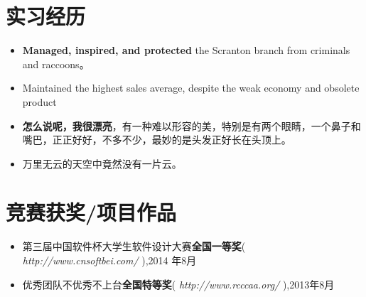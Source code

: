 \documentclass{resume_withphoto}
\begin{document}

\section{实习经历}
\begin{itemize}
  \item \textbf{Managed, inspired, and protected }the Scranton branch from criminals and raccoons。
  \item Maintained the highest sales average, despite the weak economy and obsolete product
\end{itemize}

\begin{itemize}
  \item \textbf{怎么说呢，我很漂亮}，有一种难以形容的美，特别是有两个眼睛，一个鼻子和嘴巴，正正好好，不多不少，最妙的是头发正好长在头顶上。
  \item 万里无云的天空中竟然没有一片云。
\end{itemize}


\section{竞赛获奖/项目作品}
\begin{itemize}[parsep=0.2ex]
  \item 第三届中国软件杯大学生软件设计大赛\textbf{全国一等奖}( \textit{http://www.cnsoftbei.com/} ),2014 年8月
  \item 优秀团队不优秀不上台\textbf{全国特等奖}( \textit{http://www.rcccaa.org/} ),2013年8月
\end{itemize}

\end{document}
